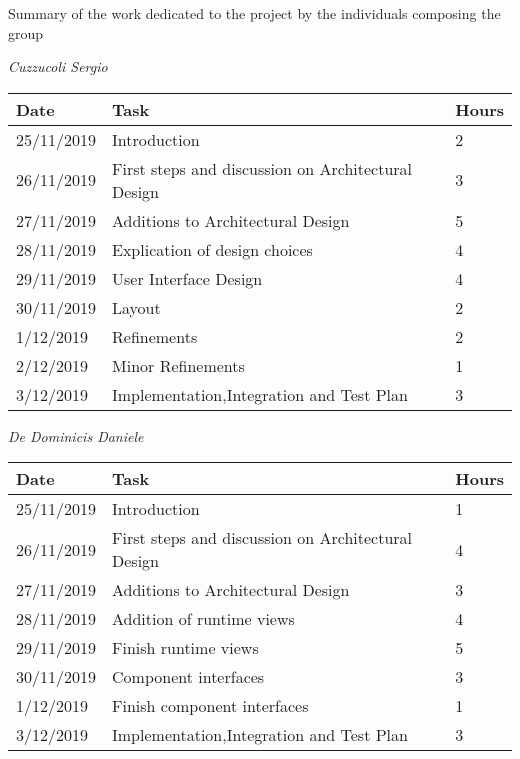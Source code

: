 Summary of the work dedicated to the project by the individuals composing the group

\vspace{1cm}

\textit{Cuzzucoli Sergio}

\hfill

\begin{tabular}{|l|l|l|}

\hline

\textbf{Date} & \textbf{Task} & \textbf{Hours} \\ \hline
25/11/2019 & Introduction &  2 \\ \hline
26/11/2019 & First steps and discussion on Architectural Design & 3 \\ \hline
27/11/2019 & Additions to Architectural Design & 5 \\ \hline
28/11/2019 & Explication of design choices & 4 \\ \hline
29/11/2019 & User Interface Design & 4 \\ \hline
30/11/2019 & Layout & 2 \\ \hline
1/12/2019 & Refinements & 2\\ \hline
2/12/2019 & Minor Refinements & 1\\ \hline
3/12/2019 & Implementation,Integration and Test Plan & 3\\ \hline
\end{tabular}

\vspace{1cm}

\textit{De Dominicis Daniele}

\hfill

\begin{tabular}{|l|l|l|}

\hline

\textbf{Date} & \textbf{Task} & \textbf{Hours} \\ \hline
25/11/2019 & Introduction &  1 \\ \hline
26/11/2019 & First steps and discussion on Architectural Design & 4 \\ \hline
27/11/2019 & Additions to Architectural Design & 3 \\ \hline
28/11/2019 & Addition of runtime views & 4 \\ \hline
29/11/2019 & Finish runtime views & 5 \\ \hline
30/11/2019 & Component interfaces & 3 \\ \hline
1/12/2019 & Finish component interfaces & 1\\ \hline
3/12/2019 & Implementation,Integration and Test Plan & 3\\ \hline
\end{tabular}